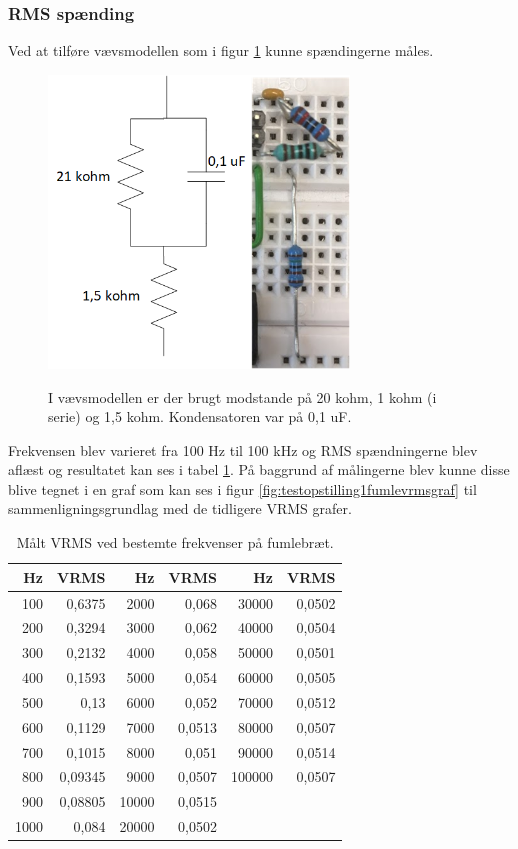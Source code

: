 \subsubsection{RMS spænding}
Ved at tilføre vævsmodellen som i figur \ref{fig:testopstilling1fumlevaevs} kunne spændingerne måles.


\begin{figure}[H]
\centering
{\includegraphics[width=8cm]
{Figure/testopstilling1fumlevaevs}}
\caption{I vævsmodellen er der brugt modstande på 20 kohm, 1 kohm (i serie) og 1,5 kohm. Kondensatoren var på 0,1 uF.}
\label{fig:testopstilling1fumlevaevs}
\end{figure}

Frekvensen blev varieret fra 100 Hz til 100 kHz og RMS spændningerne blev aflæst og resultatet kan ses i tabel \ref{table:fumlebraetfrekvenservrms}. På baggrund af målingerne blev kunne disse blive tegnet i en graf som kan ses i figur \ref{fig:testopstilling1fumlevrmsgraf} til sammenligningsgrundlag med de tidligere VRMS grafer.

\begin{table}[H]
\centering
\begin{tabular}{| r | r || r | r || r | r |}
    \hline
    \textbf{Hz} & \textbf{VRMS} & \textbf{Hz} & \textbf{VRMS} & \textbf{Hz} & \textbf{VRMS}\\ \hline
    100 & 0,6375 & 2000 & 0,068 & 30000 & 0,0502 \\ \hline
    200 & 0,3294 & 3000 & 0,062 & 40000 & 0,0504   \\ \hline
    300 & 0,2132 & 4000 & 0,058 & 50000 & 0,0501   \\ \hline
    400 & 0,1593 & 5000 & 0,054 & 60000 & 0,0505   \\ \hline
    500 & 0,13 & 6000 & 0,052 & 70000 & 0,0512  \\ \hline
    600 & 0,1129 & 7000 & 0,0513 & 80000 & 0,0507   \\ \hline
    700 & 0,1015 & 8000 & 0,051 & 90000 & 0,0514  \\ \hline
    800 & 0,09345 & 9000 & 0,0507 & 100000 & 0,0507   \\ \hline
    900 & 0,08805 & 10000 & 0,0515 &  &     \\ \hline
    1000 & 0,084 & 20000 & 0,0502 & &   \\ \hline
\end{tabular}
    \caption{Målt VRMS ved bestemte frekvenser på fumlebræt.}
    \label{table:fumlebraetfrekvenservrms}
\end{table} 


